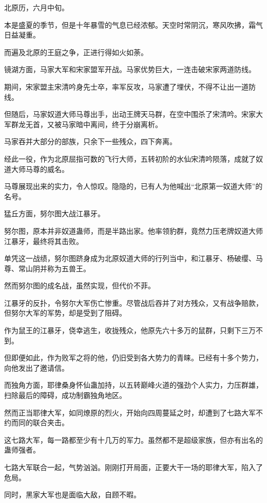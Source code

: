 
\begin{this_body}

北原历，六月中旬。

本是盛夏的季节，但是十年暴雪的气息已经浓郁。天空时常阴沉，寒风吹拂，霜气日益凝重。

而遍及北原的王庭之争，正进行得如火如荼。

镜湖方面，马家大军和宋家盟军开战。马家优势巨大，一连击破宋家两道防线。

期间，宋家盟主宋清吟身先士卒，率军反攻，马家遭了埋伏，不得不让出一道防线。

但随后，马家奴道大师马尊出手，出动王牌天马群，在空中围杀了宋清吟。宋家大军群龙无首，又被马家暗中离间，终于分崩离析。

马家吞并大部分的部族，只余下一些残众，四下奔离。

经此一役，作为北原屈指可数的飞行大师，五转初阶的水仙宋清吟陨落，成就了奴道大师马尊的威名。

马尊展现出来的实力，令人惊叹。隐隐的，已有人为他喊出“北原第一奴道大师”的名号。

猛丘方面，努尔图大战江暴牙。

努尔图，原本并非奴道蛊师，而是半路出家。他率领豹群，竟然力压老牌奴道大师江暴牙，最终将其击败。

单凭这一战绩，努尔图跻身成为北原奴道大师的行列当中，和江暴牙、杨破缨、马尊、常山阴并称为五兽王。

然而努尔图的成名战，虽然实现，但代价不菲。

江暴牙的反扑，令努尔大军伤亡惨重。尽管战后吞并了对方残众，又有战争赔款，但努尔大军的军势，却是受到了阻碍。

作为鼠王的江暴牙，侥幸逃生，收拢残众，他原先六十多万的鼠群，只剩下三万不到。

但即便如此，作为败军之将的他，仍旧受到各大势力的青睐。已经有十多个势力，向他发出了邀请信。

而独角方面，耶律桑身怀仙蛊加持，以五转巅峰火道的强劲个人实力，力压群雄，扫除最后的障碍，成功制霸独角地区。

然而正当耶律大军，如同燎原的烈火，开始向四周蔓延之时，却遭到了七路大军不约而同的联合夹击。

这七路大军，每一路都至少有十几万的军力。虽然都不是超级家族，但亦有出名的蛊师强者。

七路大军联合一起，气势汹汹。刚刚打开局面，正要大干一场的耶律大军，陷入了危局。

同时，黑家大军也是面临大敌，自顾不暇。


\end{this_body}
